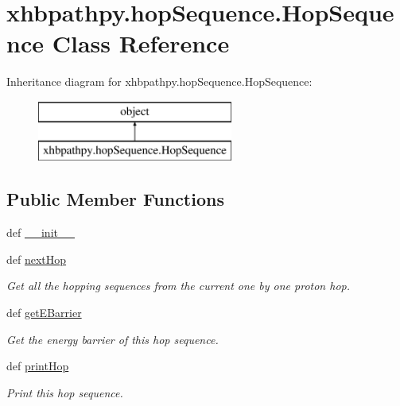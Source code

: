 \hypertarget{classxhbpathpy_1_1hop_sequence_1_1_hop_sequence}{\section{xhbpathpy.\-hop\-Sequence.\-Hop\-Sequence Class Reference}
\label{classxhbpathpy_1_1hop_sequence_1_1_hop_sequence}
}
Inheritance diagram for xhbpathpy.\-hop\-Sequence.\-Hop\-Sequence\-:\begin{figure}[H]
\begin{center}
\leavevmode
\includegraphics[height=2.000000cm]{classxhbpathpy_1_1hop_sequence_1_1_hop_sequence}
\end{center}
\end{figure}
\subsection*{Public Member Functions}
\begin{DoxyCompactItemize}
\item 
def \hyperlink{classxhbpathpy_1_1hop_sequence_1_1_hop_sequence_adc84862973bac63a8e5f500898de55c3}{\-\_\-\-\_\-init\-\_\-\-\_\-}
\item 
def \hyperlink{classxhbpathpy_1_1hop_sequence_1_1_hop_sequence_ad8e8fd6c422af62fa439fd4a9400acc4}{next\-Hop}
\begin{DoxyCompactList}\small\item\em Get all the hopping sequences from the current one by one proton hop. \end{DoxyCompactList}\item 
def \hyperlink{classxhbpathpy_1_1hop_sequence_1_1_hop_sequence_ad564ff72590f7a78c7ffc3a812dbf938}{get\-E\-Barrier}
\begin{DoxyCompactList}\small\item\em Get the energy barrier of this hop sequence. \end{DoxyCompactList}\item 
def \hyperlink{classxhbpathpy_1_1hop_sequence_1_1_hop_sequence_a249d22d00357e33517ede69ff718516f}{print\-Hop}
\begin{DoxyCompactList}\small\item\em Print this hop sequence. \end{DoxyCompactList}\end{DoxyCompactItemize}
